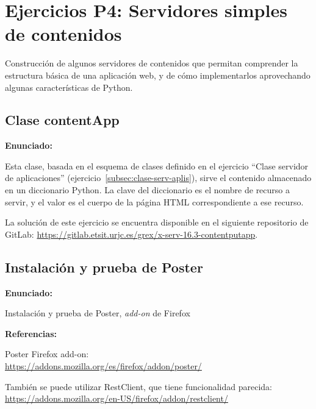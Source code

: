 \section{Ejercicios P4: Servidores simples de contenidos}

Construcción de algunos servidores de contenidos que permitan comprender la estructura básica de una aplicación web, y de cómo implementarlos aprovechando algunas características de Python.

\subsection{Clase contentApp}
\label{subsec:contentapp}

\textbf{Enunciado:}

Esta clase, basada en el esquema de clases definido en el ejercicio ``Clase servidor de aplicaciones'' (ejercicio~\ref{subsec:clase-serv-aplis}), sirve el contenido almacenado en un diccionario Python. La clave del diccionario es el nombre de recurso a servir, y el valor es el cuerpo de la página HTML correspondiente a ese recurso.

La solución de este ejercicio se encuentra disponible en el siguiente repositorio de 
GitLab: \url{https://gitlab.etsit.urjc.es/grex/x-serv-16.3-contentputapp}.


\subsection{Instalación y prueba de Poster}
\label{subsec:inst-poster}

\textbf{Enunciado:}

Instalación y prueba de Poster, \emph{add-on} de Firefox

\textbf{Referencias:}

Poster Firefox add-on: \\
\url{https://addons.mozilla.org/es/firefox/addon/poster/}

También se puede utilizar RestClient, que tiene funcionalidad parecida: \\
\url{https://addons.mozilla.org/en-US/firefox/addon/restclient/}

